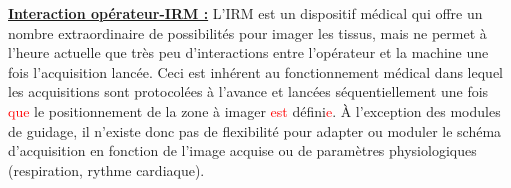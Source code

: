 \underline{\textbf{Interaction opérateur-IRM :}} L’IRM est un dispositif médical qui offre un nombre extraordinaire de possibilités pour imager les tissus, mais ne permet à l’heure actuelle que très peu d’interactions entre l’opérateur et la machine une fois l’acquisition lancée. Ceci est inhérent au fonctionnement médical dans lequel les acquisitions sont protocolées à l’avance et lancées séquentiellement une fois \textcolor{red}{que} le positionnement de la zone à imager \textcolor{red}{est} défini\textcolor{red}{e}. À l’exception des modules de guidage, il n’existe donc pas de flexibilité pour adapter ou moduler le schéma d’acquisition en fonction de l’image acquise ou de paramètres physiologiques (respiration, rythme cardiaque).\\